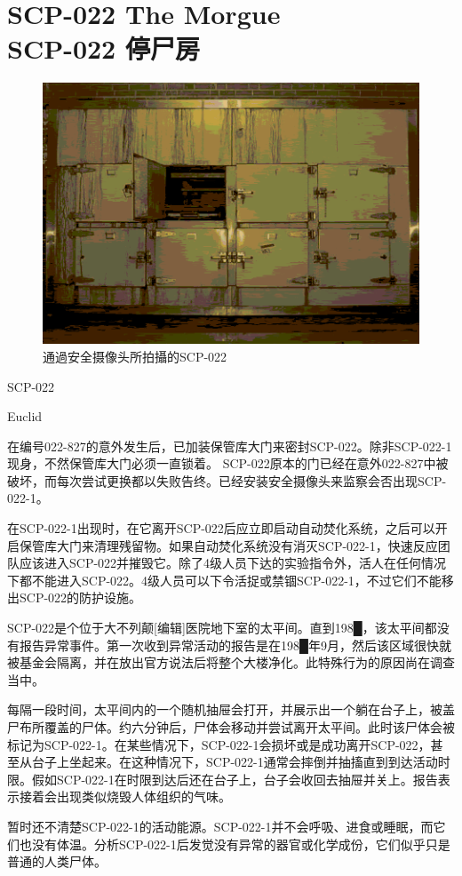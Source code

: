 \chapter[SCP-022 停尸房]{
    SCP-022 The Morgue\\
    SCP-022 停尸房
}

\label{chap:SCP-022}

\begin{figure}[H]
    \centering
    \includegraphics[width=0.5\linewidth]{images/SCP-022.png}
    \caption*{通過安全摄像头所拍攝的SCP-022}
\end{figure}

 SCP-022

 Euclid

 在编号022-827的意外发生后，已加装保管库大门来密封SCP-022。除非SCP-022-1现身，不然保管库大门必须一直锁着。 SCP-022原本的门已经在意外022-827中被破坏，而每次尝试更换都以失败告终。已经安装安全摄像头来监察会否出现SCP-022-1。

在SCP-022-1出现时，在它离开SCP-022后应立即启动自动焚化系统，之后可以开启保管库大门来清理残留物。如果自动焚化系统没有消灭SCP-022-1，快速反应团队应该进入SCP-022并摧毁它。除了4级人员下达的实验指令外，活人在任何情况下都不能进入SCP-022。4级人员可以下令活捉或禁锢SCP-022-1，不过它们不能移出SCP-022的防护设施。

 SCP-022是个位于大不列颠[编辑]医院地下室的太平间。直到198█，该太平间都没有报告异常事件。第一次收到异常活动的报告是在198█年9月，然后该区域很快就被基金会隔离，并在放出官方说法后将整个大楼净化。此特殊行为的原因尚在调查当中。

每隔一段时间，太平间内的一个随机抽屉会打开，并展示出一个躺在台子上，被盖尸布所覆盖的尸体。约六分钟后，尸体会移动并尝试离开太平间。此时该尸体会被标记为SCP-022-1。在某些情况下，SCP-022-1会损坏或是成功离开SCP-022，甚至从台子上坐起来。在这种情况下，SCP-022-1通常会摔倒并抽搐直到到达活动时限。假如SCP-022-1在时限到达后还在台子上，台子会收回去抽屉并关上。报告表示接着会出现类似烧毁人体组织的气味。

暂时还不清楚SCP-022-1的活动能源。SCP-022-1并不会呼吸、进食或睡眠，而它们也没有体温。分析SCP-022-1后发觉没有异常的器官或化学成份，它们似乎只是普通的人类尸体。

